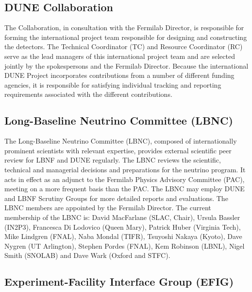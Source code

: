 \subsection{DUNE Collaboration}	

The Collaboration, in consultation with the Fermilab Director,
is responsible for forming the international project team 
responsible for designing and constructing the detectors.  
The Technical Coordinator
(TC) and Resource Coordinator (RC) serve as the lead managers
of this international project team and are selected jointly by
the spokespersons and the Fermilab Director.  Because the international DUNE
Project incorporates contributions from a number of different
funding agencies, it %
is responsible for
satisfying individual tracking and reporting requirements associated
with %
the different contributions.

\subsection{Long-Baseline Neutrino Committee (LBNC)}

The Long-Baseline Neutrino Committee (LBNC), composed
of internationally prominent scientists with relevant expertise,
provides external scientific peer review for LBNF and DUNE %
regularly.
The LBNC reviews the scientific, technical and managerial
decisions and preparations for the neutrino program.
It acts in effect %
as an adjunct to the Fermilab Physics Advisory Committee
(PAC), meeting on a more frequent basis than the PAC.
The LBNC may employ DUNE and LBNF Scrutiny Groups for more
detailed reports and evaluations. The LBNC members are appointed by the
Fermilab Director. The current membership of the LBNC is:
%
David MacFarlane (SLAC, Chair),
Ursula Bassler (IN2P3),
Francesca Di Lodovico (Queen Mary),
Patrick Huber (Virginia Tech),
Mike Lindgren (FNAL),
Naba Mondal (TIFR),
Tsuyoshi Nakaya (Kyoto),
Dave Nygren (UT Arlington),
Stephen Pordes (FNAL),
Kem Robinson (LBNL),
Nigel Smith (SNOLAB) and
Dave Wark (Oxford and STFC).

\subsection{Experiment-Facility Interface Group (EFIG)}

